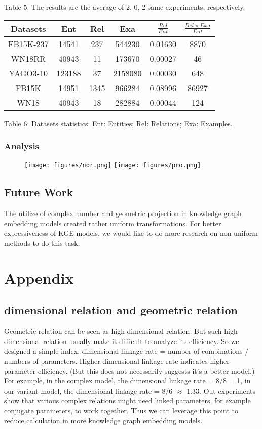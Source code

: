 \documentclass[9pt]{ctexart}
\theoremstyle{definition}
\begin{document}
\begin{center}
Table 5: The results are the average of 2, 0, 2 same experiments, respectively.

\bigskip

\begin{tabular}{cccccc}
    \toprule
    Datasets & Ent & Rel & Exa & $\frac{Rel}{Ent}$ & $\frac{Rel\times Exa}{Ent}$\\
    \midrule
    FB15K-237 & 14541 & 237 & 544230 & 0.01630 & 8870\\
    WN18RR & 40943 & 11 & 173670 & 0.00027 & 46\\
    YAGO3-10 & 123188 & 37 & 2158080 & 0.00030 & 648\\
    FB15K & 14951 & 1345 & 966284 & 0.08996 & 86927\\
    WN18 & 40943 & 18 & 282884 & 0.00044 &124\\
    \bottomrule
\end{tabular}

Table 6: Datasets statistics: Ent: Entities; Rel: Relations; Exa: Examples.
\end{center}

\subsubsection{Analysis}
\begin{figure}[!hp]
    \centering
    \texttt{[image: figures/nor.png]}
    \texttt{[image: figures/pro.png]}
    \end{figure}

\subsection{Future Work}
The utilize of complex number and geometric projection in knowledge graph embedding models created rather uniform transformations.
For better expressiveness of KGE models, we would like to do more research on non-uniform methods to do this task.

\section{Appendix}
\subsection{dimensional relation and geometric relation}
Geometric relation can be seen as high dimensional relation. 
But such high dimensional relation usually make it difficult to analyze its efficiency. 
So we designed a simple index: dimensional linkage rate = number of combinations / numbers of parameters.
Higher dimensional linkage rate indicates higher parameter efficiency. (But this does not necessarily suggests it's a better model.)
For example, in the complex model, the dimensional linkage rate = 8/8 = 1, in our variant model, the dimensional linkage rate = 8/6 $\approx$ 1.33. 
Out experiments show that various complex relations might need linked parameters, for example conjugate parameters, to work together.
Thus we can leverage this point to reduce calculation in more knowledge graph embedding models.
\end{document}
